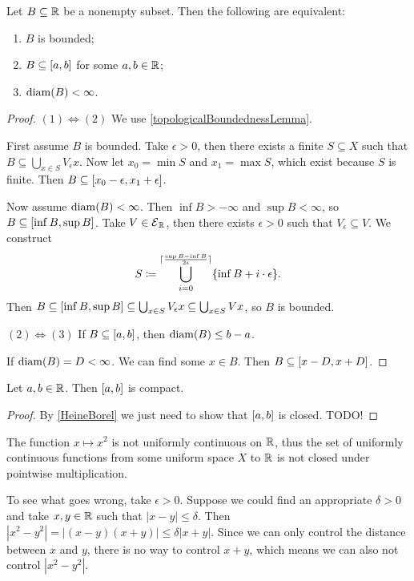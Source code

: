 \begin{proposition} \label{boundedSubsetsRealNumbers}
Let $B\subseteq \mathbb{R}$ be a nonempty subset. Then the following are equivalent:
\begin{enumerate}
\item $B$ is bounded;
\item $B\subseteq \interval{a,b}$ for some $a,b\in \mathbb{R}$;
\item $\operatorname{diam}(B) < \infty$.
\end{enumerate}
\end{proposition}
\begin{proof}
$(1) \Leftrightarrow (2)$ We use \ref{topologicalBoundednessLemma}.

First assume $B$ is bounded. Take $\epsilon>0$, then there exists a finite $S\subseteq X$ such that $B\subseteq \bigcup_{x\in S}V_\epsilon x$. Now let $x_0 = \min S$ and $x_1 = \max S$, which exist because $S$ is finite. Then $B\subseteq \interval{x_0-\epsilon, x_1+\epsilon}$.

Now assume $\operatorname{diam}(B) < \infty$. Then $\inf B > -\infty$ and $\sup B < \infty$, so $B\subseteq \interval{\inf B, \sup B}$. Take $V\in \operatorname{\mathcal{E}}_{\mathbb{R}}$, then there exists $\epsilon >0$ such that $V_\epsilon \subseteq V$. We construct
\[ S \coloneqq \bigcup_{i=0}^{\lceil\frac{\sup B - \inf B}{2\epsilon}\rceil}\{\inf B + i\cdot \epsilon\}. \]
Then $B\subseteq \interval{\inf B, \sup B} \subseteq \bigcup_{x\in S}V_\epsilon x \subseteq \bigcup_{x\in S}V x$, so $B$ is bounded.

$(2) \Leftrightarrow (3)$ If $B\subseteq \interval{a,b}$, then $\operatorname{diam}(B) \leq b-a$.

If $\operatorname{diam}(B) = D <\infty$. We can find some $x\in B$. Then $B\subseteq \interval{x-D, x+D}$.
\end{proof}
\begin{corollary} \label{closedRealIntervalCompact}
Let $a,b\in \mathbb{R}$. Then $\interval{a,b}$ is compact.
\end{corollary}
\begin{proof}
By \ref{HeineBorel} we just need to show that $\interval{a,b}$ is closed. TODO!
\end{proof}

\begin{example}
The function $x\mapsto x^2$ is not uniformly continuous on $\mathbb{R}$, thus the set of uniformly continuous functions from some uniform space $X$ to $\mathbb{R}$ is not closed under pointwise multiplication.

To see what goes wrong, take $\epsilon >0$. Suppose we could find an appropriate $\delta >0$ and take $x,y\in \mathbb{R}$ such that $|x-y|\leq \delta$. Then $|x^2 - y^2| = \big|(x-y)(x+y)\big|\leq \delta |x+y|$. Since we can only control the distance between $x$ and $y$, there is no way to control $x+y$, which means we can also not control $|x^2 - y^2|$.
\end{example}


